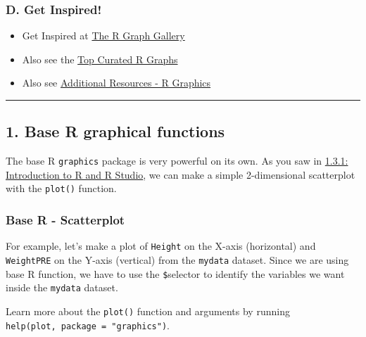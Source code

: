 \documentclass[
  letterpaper,
  DIV=11,
  numbers=noendperiod]{scrartcl}
\newenvironment{Shaded}{\begin{snugshade}}{\end{snugshade}}
\newcommand{\AttributeTok}[1]{\textcolor[rgb]{0.40,0.45,0.13}{#1}}
\newcommand{\FunctionTok}[1]{\textcolor[rgb]{0.28,0.35,0.67}{#1}}
\newcommand{\NormalTok}[1]{\textcolor[rgb]{0.00,0.23,0.31}{#1}}
\newcommand{\SpecialCharTok}[1]{\textcolor[rgb]{0.37,0.37,0.37}{#1}}
\providecommand{\tightlist}{%
  \setlength{\itemsep}{0pt}\setlength{\parskip}{0pt}}\usepackage{longtable,booktabs,array}
\begin{document}
\subsubsection{D. Get Inspired!}\label{d.-get-inspired}

\begin{itemize}
\tightlist
\item
  Get Inspired at \href{https://r-graph-gallery.com/}{The R Graph
  Gallery}
\item
  Also see the
  \href{https://r-graph-gallery.com/best-r-chart-examples}{Top Curated R
  Graphs}
\item
  Also see \href{additionalResources.html\#r-graphics}{Additional
  Resources - R Graphics}
\end{itemize}

\begin{center}\rule{0.5\linewidth}{0.5pt}\end{center}

\newpage

\subsection{1. Base R graphical
functions}\label{base-r-graphical-functions}

The base R \texttt{graphics} package is very powerful on its own. As you
saw in \href{module131_IntroRRStudio.html}{1.3.1: Introduction to R and
R Studio}, we can make a simple 2-dimensional scatterplot with the
\texttt{plot()} function.

\subsubsection{Base R - Scatterplot}\label{base-r---scatterplot}

For example, let's make a plot of \texttt{Height} on the X-axis
(horizontal) and \texttt{WeightPRE} on the Y-axis (vertical) from the
\texttt{mydata} dataset. Since we are using base R function, we have to
use the \texttt{\$}selector to identify the variables we want inside the
\texttt{mydata} dataset.

Learn more about the \texttt{plot()} function and arguments by running
\texttt{help(plot,\ package\ =\ "graphics")}.

\begin{Shaded}
\end{Shaded}
\end{document}
